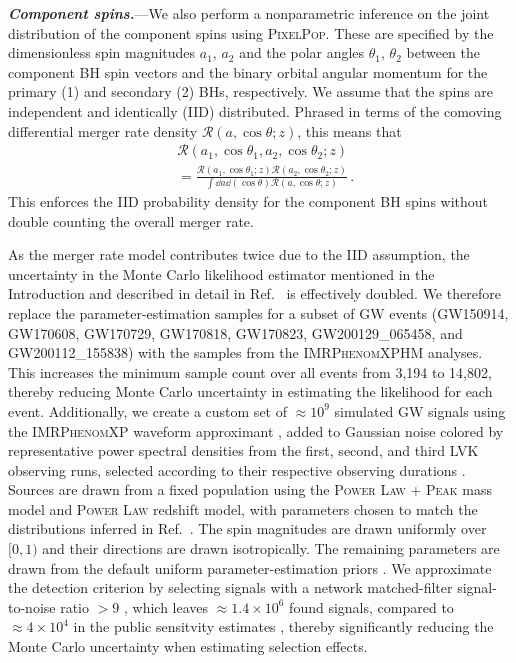 \documentclass[
 reprint,
 amsmath,
 amssymb,
 aps,
 prl,
 nofootinbib,
 nobibnotes,
]{revtex4-2}
\newcommand{\heading}[1]{\textbf{\textit{#1.}}}
\begin{document}
\heading{Component spins}---We also perform a nonparametric inference on the joint distribution of the component spins using \textsc{PixelPop}. These are specified by the dimensionless spin magnitudes $a_1$, $a_2$ and the polar angles $\theta_1$, $\theta_2$ between the component BH spin vectors and the binary orbital angular momentum for the primary (1) and secondary (2) BHs, respectively. We assume that the spins are independent and identically (IID) distributed. Phrased in terms of the comoving differential merger rate density $\mathcal{R} ( a , \cos\theta ; z )$, this means that
\begin{align}
& \mathcal{R} ( a_1 , \cos\theta_1 , a_2 , \cos\theta_2 ; z )
\nonumber \\
& =
\frac
{ \mathcal{R} ( a_1 , \cos\theta_1 ; z ) \mathcal{R} ( a_2 , \cos\theta_2 ; z ) }
{ \int \dd{a} \dd{(\cos\theta)} \mathcal{R} ( a , \cos\theta ; z ) }
\, .
\end{align}
This enforces the IID probability density for the component BH spins without double counting the overall merger rate.

As the merger rate model contributes twice due to the IID assumption, the uncertainty in the Monte Carlo likelihood estimator mentioned in the Introduction and described in detail in Ref.~\cite{Heinzel:2024jlc} is effectively doubled. We therefore replace the parameter-estimation samples for a subset of GW events (GW150914, GW170608, GW170729, GW170818, GW170823, GW200129\_065458, and GW200112\_155838) with the samples from the \textsc{IMRPhenomXPHM} \cite{Pratten:2020ceb} analyses. This increases the minimum sample count over all events from 3,194 to 14,802, thereby reducing Monte Carlo uncertainty in estimating the likelihood for each event. Additionally, we create a custom set of $\approx 10^9$ simulated GW signals using the \textsc{IMRPhenomXP} waveform approximant \cite{Pratten:2020ceb}, added to Gaussian noise colored by representative power spectral densities from the first, second, and third LVK observing runs, selected according to their respective observing durations \cite{KAGRA:2013rdx}. Sources are drawn from a fixed population using the \textsc{Power Law + Peak} mass model and \textsc{Power Law} redshift model, with parameters chosen to match the distributions inferred in Ref.~\cite{KAGRA:2021duu}. The spin magnitudes are drawn uniformly over $[0,1)$ and their directions are drawn isotropically. The remaining parameters are drawn from the default uniform parameter-estimation priors \cite{LIGOScientific:2021djp}. We approximate the detection criterion by selecting signals with a network matched-filter signal-to-noise ratio $>9$ \cite{Essick:2023toz}, which leaves $\approx1.4\times10^6$ found signals, compared to $\approx4\times10^4$ in the public sensitvity estimates \cite{ligo_scientific_collaboration_and_virgo_2023_7890398}, thereby significantly reducing the Monte Carlo uncertainty when estimating selection effects.
\end{document}

